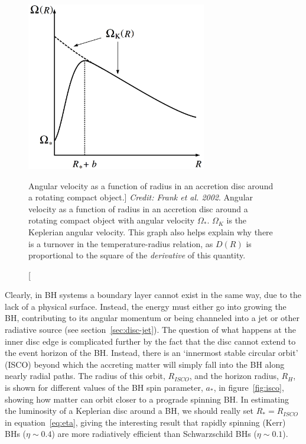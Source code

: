 \begin{figure}
\centering
\includegraphics[width=0.7\textwidth]{figures/01-intro/omega.png}
\caption
[Angular velocity as a function of radius in an accretion disc around a rotating
compact object.]
{
{\sl Credit: Frank et al. 2002}.
Angular velocity as a function of radius in an accretion disc around a rotating
compact object with angular velocity $\Omega_*$. $\Omega_K$ is the Keplerian 
angular velocity. This graph
also helps explain why there is a turnover in the temperature-radius relation,
as $D(R)$ is proportional to the square of the {\em derivative} of this quantity.
} 
\label{fig:omega}
\end{figure}

Clearly, in BH systems a boundary layer cannot exist in the same way,
due to the lack of a physical surface. Instead, the energy must either go into
growing the BH, contributing to its angular momentum or being
channeled into a jet or other radiative source (see section~\ref{sec:disc-jet}).
The question of what happens at the inner disc edge
is complicated further by the fact that the disc cannot extend to the 
event horizon of the BH. Instead, there is an `innermost stable circular orbit' (ISCO)
beyond which the accreting matter will simply fall 
into the BH along nearly radial paths. The radius
of this orbit, $R_{ISCO}$, and the horizon radius, $R_H$,
is shown for different values of the BH spin parameter, $a_*$, 
in figure~\ref{fig:isco}, showing how matter can orbit closer to a prograde spinning BH. 
In estimating the luminosity of a Keplerian disc around a BH, 
we should really set $R_* = R_{ISCO}$ in equation~\ref{eq:eta}, 
giving the interesting result that rapidly spinning (Kerr) BHs ($\eta\sim0.4$)
are more radiatively efficient than Schwarzschild BHs ($\eta\sim0.1$).

